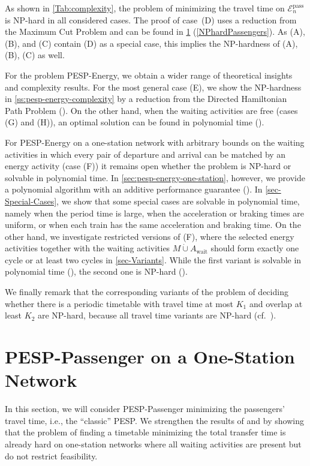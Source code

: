 \documentclass[11pt,a4paper]{article}
\newcommand{\dotcup}{\mathbin{\dot\cup}}
\newcommand{\wait}{\mathrm{wait}}
\newcommand{\energyact}{M}               %
\newcommand{\pesppassenger}{PESP-Passenger\xspace}
\newcommand{\pespenergy}{PESP-Energy\xspace}
\newcommand{\osn}{one-station network\xspace}
\newcommand{\cE}{\mathcal{E}}
\theoremstyle{definition}
\theoremstyle{remark}
\begin{document}
As shown in \cref{Tab:complexity}, the problem of minimizing the travel time on $\cE_n^{\mathrm{pass}}$ is NP-hard in all considered cases. The proof of case~(D) uses a reduction from the Maximum Cut Problem and can be found in \cref{sec:one-transfer} (\cref{NPhardPassengers}). As (A), (B), and (C) contain (D) as a special case, this implies the NP-hardness of (A), (B), (C) as well.


For the problem \pespenergy, we obtain a wider range of theoretical insights and complexity results. 
For the most general case (E), we show the NP-hardness in \cref{ss:pesp-energy-complexity} by a reduction from the Directed Hamiltonian Path Problem ().
On the other hand, when the waiting activities are free (cases (G) and (H)), an optimal solution can be found in polynomial time ().

For \pespenergy on a \osn with arbitrary bounds on the waiting activities in which every pair of departure and arrival can be matched by an energy activity (case (F)) it remains open whether the problem is NP-hard or solvable in polynomial time. In \cref{sec:pesp-energy-one-station}, however, we provide a polynomial algorithm with an additive performance guarantee (). In \cref{sec-Special-Cases}, we show that some special cases are solvable in polynomial time, namely when the period time is large, when the acceleration or braking times are uniform, or when each train has the same acceleration and braking time.
On the other hand, we investigate restricted versions of (F), where the selected energy activities together with the waiting activities $\energyact \dotcup A_{\wait}$ should form exactly one cycle or at least two cycles in \cref{sec-Variants}. While the first variant is solvable in polynomial time (), the second one is NP-hard ().


We finally remark that the corresponding variants of the problem of deciding whether there is a periodic timetable with travel time at most $K_1$ and overlap at least $K_2$ are NP-hard, because all travel time variants are NP-hard (cf.\ ).


\section{\pesppassenger on a One-Station Network} \label{sec:one-transfer}

In this section, we will consider \pesppassenger minimizing the passengers' travel time, i.e., the ``classic'' PESP.  We strengthen the results of \cite{Nachtigall1993} and \cite{odijk1994} by showing that the problem of finding a timetable minimizing the total transfer time is already hard on one-station networks where all waiting activities are present but do not restrict feasibility.
\end{document}
